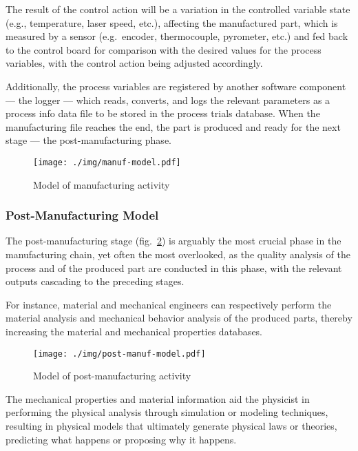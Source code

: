 The result of the control action will be a variation in the
controlled variable state (e.g., temperature, laser speed, etc.), affecting
the manufactured part, which is measured by a sensor (e.g.~encoder,
thermocouple, pyrometer, etc.) and fed back to the control board for
comparison with the desired values for the process variables, with the
control action being adjusted accordingly.

Additionally, the process
variables are registered by another software component --- the logger --- which
reads, converts, and logs the relevant parameters as a process info data
file to be stored in the process trials database. When the manufacturing
file reaches the end, the part is produced and ready for the next stage ---
the post-manufacturing phase.

  \begin{figure}[!hbt]
    \centering
      \texttt{[image: ./img/manuf-model.pdf]}
    \caption{Model of manufacturing activity}%
\label{fig:manuf_model}
  \end{figure}

\subsubsection{Post-Manufacturing Model}%
\label{sec:post-manuf_model}
The post-manufacturing stage (fig.~\ref{fig:post-manuf_model}) is arguably
the most crucial phase in the manufacturing chain, yet often the most overlooked, as the
quality analysis of the process and of the produced part are conducted in
this phase, with the relevant outputs cascading to the preceding stages.

For instance, material and mechanical engineers can respectively perform the material analysis and mechanical behavior analysis of the produced parts, thereby increasing the material and mechanical properties databases.

\begin{figure}[!hbtp]
\centering
\texttt{[image: ./img/post-manuf-model.pdf]}
\caption{Model of post-manufacturing activity}%
\label{fig:post-manuf_model}
\end{figure}

The mechanical properties and material information aid the physicist in performing the physical analysis through simulation or modeling techniques, resulting in physical models that ultimately generate physical laws or theories, predicting what happens or proposing why it happens.

